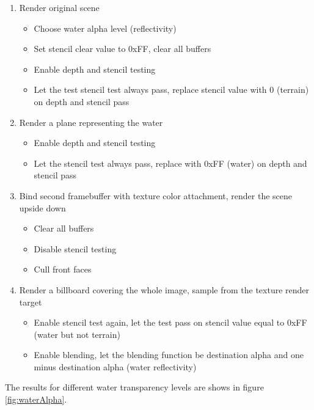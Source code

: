 \documentclass{article}
\begin{document}
\begin{enumerate}\label{enum:reflectAlgo}
    \item Render original scene
    \begin{itemize}
        \item Choose water alpha level (reflectivity)
        \item Set stencil clear value to 0xFF, clear all buffers
        \item Enable depth and stencil testing
        \item Let the test stencil test always pass, replace stencil value with 0 (terrain) on depth and stencil pass
    \end{itemize}
    \item Render a plane representing the water
    \begin{itemize}
        \item Enable depth and stencil testing
        \item Let the stencil test always pass, replace with 0xFF (water) on depth and stencil pass
    \end{itemize}
    \item Bind second framebuffer with texture color attachment, render the scene upside down 
    \begin{itemize}
        \item Clear all buffers
        \item Disable stencil testing
        \item Cull front faces
    \end{itemize}
    \item Render a billboard covering the whole image, sample from the texture render target
    \begin{itemize}
        \item Enable stencil test again, let the test pass on stencil value equal to 0xFF (water but not terrain)
        \item Enable blending, let the blending function be destination alpha and one minus destination alpha (water reflectivity)
    \end{itemize}
\end{enumerate}

The results for different water transparency levels are shows in figure \ref{fig:waterAlpha}.
\end{document}
